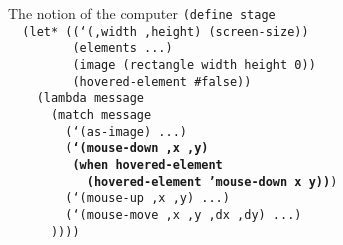 \begin{frame}{The notion of the computer}
  \scriptsize
  \texttt{(define stage\\
    \ \ (let* ((`(,width ,height) (screen-size))\\
    \ \ \ \ \ \ \ \ \ (elements ...)\\
    \ \ \ \ \ \ \ \ \ (image (rectangle width height 0))\\
    \ \ \ \ \ \ \ \ \ (hovered-element \#false))\\
    \ \ \ \ (lambda message\\
    \ \ \ \ \ \ (match message\\
    \ \ \ \ \ \ \ \ (`(as-image) ...)\\
    \ \ \ \ \ \ \ \ (\textbf{`(mouse-down ,x ,y)\\
    \ \ \ \ \ \ \ \ \ (when hovered-element\\
    \ \ \ \ \ \ \ \ \ \ \ (hovered-element 'mouse-down x y))})\\
    \ \ \ \ \ \ \ \ (`(mouse-up ,x ,y) ...)\\
    \ \ \ \ \ \ \ \ (`(mouse-move ,x ,y ,dx ,dy) ...)\\
    \ \ \ \ \ \ ))))\\
    \ \\
    \ \\
    \ \\
    \ \\
    \ \\
    \ \\
    \ \\
    \ \\
    \ 
}
\end{frame}


